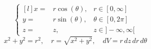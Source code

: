 \begin{equation*}
    \left\{
    \begin{matrix*}[l]
        x = & r\cos(\theta), & r\in [0,\infty]\\
        y = & r\sin(\theta), & \theta\in [0,2\pi]\\
        z = & z, & z \in ]-\infty,\infty[
    \end{matrix*}
    \right.
\end{equation*}
\[ x^2+y^2=r^2,\quad r=\sqrt{x^2+y^2}, \quad dV = r\,dz\,dr\,d\theta\]